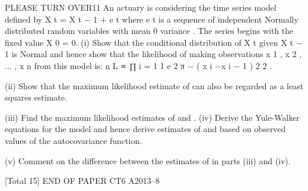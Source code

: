 
PLEASE TURN OVER11
An actuary is considering the time series model defined by
X t = \alpha X t − 1 + e t
where e t is a sequence of independent Normally distributed random variables with
mean 0 variance  . The series begins with the fixed value X 0 = 0.
(i)
Show that the conditional distribution of X t given X t − 1 is Normal and hence
show that the likelihood of making observations x 1 , x 2 , ... , x n from this model
is:
n
L ∝ ∏
i = 1
1
e
2 π\sigma
−
( x i −\alpha x i − 1 ) 2
2 
.

(ii) Show that the maximum likelihood estimate of \alpha can also be regarded as a
least squares estimate.

(iii) Find the maximum likelihood estimates of \alpha and  .
(iv) Derive the Yule-Walker equations for the model and hence derive estimates of
\alpha and  based on observed values of the autocovariance function.

(v) Comment on the difference between the estimates of \alpha in parts (iii) and (iv).

[Total 15]
END OF PAPER
CT6 A2013–8


